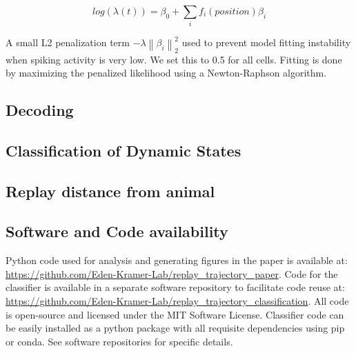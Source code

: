 \documentclass[times, twoside]{zHenriquesLab-StyleBioRxiv}
\newcommand{\norm}[1]{\left\lVert #1 \right\rVert}
\begin{document}
$$log(\lambda(t)) = \beta_{0} + \sum_{i} f_{i}(position)\beta_{i}$$

A small L2 penalization term $-\lambda\norm{\beta_{i}}_{2}^{2}$ used to prevent model fitting instability when spiking activity is very low. We set this to 0.5 for all cells. Fitting is done by maximizing the penalized likelihood using a Newton-Raphson algorithm.

\subsection*{Decoding}

\subsection*{Classification of Dynamic States}
\subsection*{Replay distance from animal}


\subsection*{Software and Code availability}
Python code used for analysis and generating figures in the paper is available at: \url{https://github.com/Eden-Kramer-Lab/replay_trajectory_paper}. Code for the classifier is available in a separate software repository to facilitate code reuse at: \url{https://github.com/Eden-Kramer-Lab/replay_trajectory_classification}. All code is open-source and licensed under the MIT Software License. Classifier code can be easily installed as a python package with all requisite dependencies using pip or conda. See software repositories for specific details.

\newpage

\beginsupplement
\captionsetup*{format=largeformat}
\end{document}
